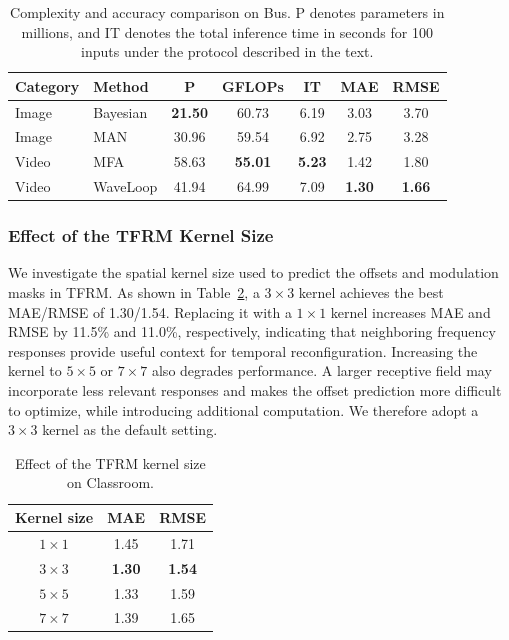 \documentclass[lettersize,journal]{IEEEtran}
\begin{document}
\begin{table}[t]
\caption{Complexity and accuracy comparison on Bus. P denotes parameters in millions, and IT denotes the total inference time in seconds for 100 inputs under the protocol described in the text.}
\centering
\scriptsize
\begin{tabular}{llccccc}
\toprule
Category & Method & P & GFLOPs & IT & MAE & RMSE \\
\midrule
Image & Bayesian~\cite{ma2019bayesian} & \textbf{21.50} & 60.73 & 6.19 & 3.03 & 3.70 \\
Image & MAN~\cite{lin2022boosting} & 30.96 & 59.54 & 6.92 & 2.75 & 3.28 \\
\midrule
Video & MFA~\cite{ling2023motional} & 58.63 & \textbf{55.01} & \textbf{5.23} & 1.42 & 1.80 \\
Video & WaveLoop & 41.94 & 64.99 & 7.09 & \textbf{1.30} & \textbf{1.66} \\
\bottomrule
\end{tabular}
\label{tab:complexity}
\end{table}

\subsubsection{Effect of the TFRM Kernel Size}
We investigate the spatial kernel size used to predict the offsets and modulation masks in TFRM. As shown in Table~\ref{tab:kernel_size}, a $3\times3$ kernel achieves the best MAE/RMSE of 1.30/1.54. Replacing it with a $1\times1$ kernel increases MAE and RMSE by 11.5\% and 11.0\%, respectively, indicating that neighboring frequency responses provide useful context for temporal reconfiguration. Increasing the kernel to $5\times5$ or $7\times7$ also degrades performance. A larger receptive field may incorporate less relevant responses and makes the offset prediction more difficult to optimize, while introducing additional computation. We therefore adopt a $3\times3$ kernel as the default setting.

\begin{table}[t]
\caption{Effect of the TFRM kernel size on Classroom.}
\centering
\scriptsize
\begin{tabular}{ccc}
\toprule
Kernel size & MAE & RMSE \\
\midrule
$1\times1$ & 1.45 & 1.71 \\
$3\times3$ & \textbf{1.30} & \textbf{1.54} \\
$5\times5$ & 1.33 & 1.59 \\
$7\times7$ & 1.39 & 1.65 \\
\bottomrule
\end{tabular}
\label{tab:kernel_size}
\end{table}
\end{document}
